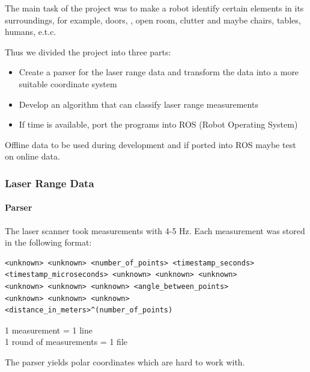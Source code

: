 \documentclass{beamer}
\begin{document}
\begin{frame}[shrink]
The main task of the project was to make a robot identify certain elements in its surroundings, for example, doors, , open room, clutter and maybe chairs, tables, humans, e.t.c.

\vspace{10pt}

Thus we divided the project into three parts:

\begin{itemize}
\pause
\item{Create a parser for the laser range data and transform the data into a more suitable coordinate system}
\pause  
\item{Develop an algorithm that can classify laser range measurements}
\pause  
\item{If time is available, port the programs into ROS (Robot Operating System)}
\end{itemize}
\pause
Offline data to be used during development and if ported into ROS maybe test on online data.

\end{frame}

\begin{frame}[fragile]
\frametitle{Laser Range Data}
\framesubtitle{Parser}

The laser scanner took measurements with 4-5 Hz. Each measurement was stored in the following format:
\begin{verbatim}
<unknown> <unknown> <number_of_points> <timestamp_seconds>
<timestamp_microseconds> <unknown> <unknown> <unknown>
<unknown> <unknown> <unknown> <angle_between_points>
<unknown> <unknown> <unknown>
<distance_in_meters>^(number_of_points)
\end{verbatim}

1 measurement = 1 line
\\
1 round of measurements = 1 file

\pause
\vspace{10pt}

The parser yields polar coordinates which are hard to work with.

\end{frame}
\end{document}
